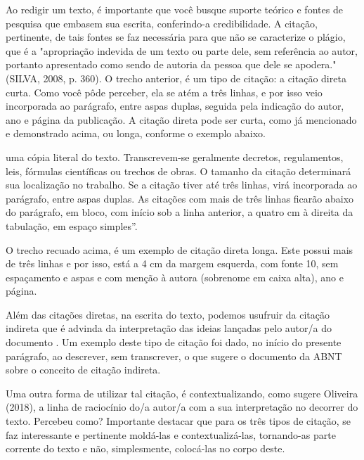 \documentclass[12pt,article,oneside,a4paper]{abntex2}
\begin{document}
Ao redigir um texto, é importante que você busque suporte teórico e fontes de pesquisa que embasem sua escrita, conferindo-a credibilidade. A citação, pertinente, de tais fontes se faz necessária para que não se caracterize o plágio, que é a "apropriação indevida de um texto ou parte dele, sem referência ao autor, portanto apresentado como sendo de autoria da pessoa que dele se apodera." (SILVA, 2008, p. 360). O trecho anterior, é um tipo de citação: a citação direta curta. Como você pôde perceber, ela se atém a três linhas, e por isso veio incorporada ao parágrafo, entre aspas duplas, seguida pela indicação do autor, ano e página da publicação. 
A citação direta pode ser curta, como já mencionado e demonstrado acima, ou longa, conforme o exemplo abaixo.


\begin{adjustwidth}{5.5cm}{0cm}
\fontsize{10pt}{1.2em}\selectfont 
\noindent uma cópia literal do texto. Transcrevem-se geralmente decretos, regulamentos, leis, fórmulas científicas ou trechos de obras. O tamanho da citação determinará sua localização no trabalho. Se a citação tiver até três linhas, virá incorporada ao parágrafo, entre aspas duplas. As citações com mais de três linhas ficarão abaixo do parágrafo, em bloco, com início sob a linha anterior, a quatro cm à direita da tabulação, em espaço simples”. \citealp{oliveira2018}\newline 
\end{adjustwidth}

O trecho recuado acima, é um exemplo de citação direta longa. Este possui mais de três linhas e por isso, está a 4 cm da margem esquerda, com fonte 10, sem espaçamento e aspas e com menção à autora (sobrenome em caixa alta), ano e página. 

Além das citações diretas, na escrita do texto, podemos usufruir da citação indireta que é advinda da interpretação das ideias lançadas pelo autor/a do documento \citep{abnt2022}. Um exemplo deste tipo de citação foi dado, no início do presente parágrafo, ao descrever, sem transcrever, o que sugere o documento da ABNT sobre o conceito de citação indireta. 

Uma outra forma de utilizar tal citação, é contextualizando, como sugere Oliveira (2018), a linha de raciocínio do/a autor/a com a sua interpretação no decorrer do texto. Percebeu como? 
Importante destacar que para os três tipos de citação, se faz interessante e pertinente moldá-las e contextualizá-las, tornando-as parte corrente do texto e não, simplesmente, colocá-las no corpo deste.
\end{document}
